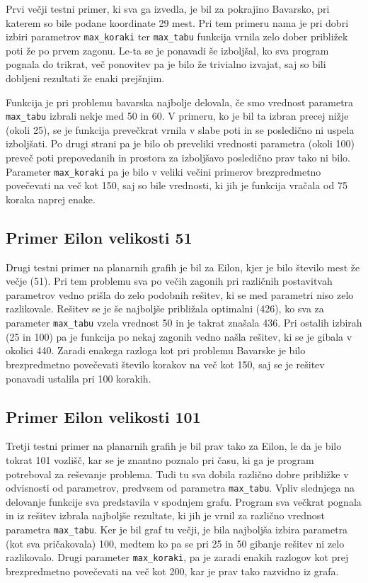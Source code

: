 \documentclass[10pt, a4paper]{article}
\begin{document}
Prvi večji testni primer, ki sva ga izvedla, je bil za pokrajino Bavarsko, pri katerem so bile podane koordinate 29 mest. Pri tem primeru nama je pri dobri izbiri parametrov \texttt{max\_koraki} ter \texttt{max\_tabu} funkcija vrnila zelo dober približek poti že po prvem zagonu. Le-ta se je ponavadi še izboljšal, ko sva program pognala do trikrat, več ponovitev pa je bilo že trivialno izvajat, saj so bili dobljeni rezultati že enaki prejšnjim. 

Funkcija je pri problemu bavarska najbolje delovala, če smo vrednost parametra \texttt{max\_tabu} izbrali nekje med 50 in 60. V primeru, ko je bil ta izbran precej nižje (okoli 25), se je funkcija prevečkrat vrnila v slabe poti in se posledično ni uspela izboljšati. Po drugi strani pa je bilo ob preveliki vrednosti parametra (okoli 100) preveč poti prepovedanih in prostora za izboljšavo posledično prav tako ni bilo. Parameter \texttt{max\_koraki} pa je bilo v veliki večini primerov brezpredmetno povečevati na več kot 150, saj so bile vrednosti, ki jih je funkcija vračala od 75 koraka naprej enake.



\subsection{Primer Eilon velikosti 51}

Drugi testni primer na planarnih grafih je bil za Eilon, kjer je bilo število mest že večje (51). Pri tem problemu sva po večih zagonih pri različnih postavitvah parametrov vedno prišla do zelo podobnih rešitev, ki se med parametri niso zelo razlikovale. Rešitev se je še najboljše približala optimalni (426), ko sva za parameter \texttt{max\_tabu} vzela vrednost 50 in je takrat znašala 436. Pri ostalih izbirah (25 in 100) pa je funkcija po nekaj zagonih vedno našla rešitev, ki se je gibala v okolici 440. Zaradi enakega razloga kot pri problemu Bavarske je bilo brezpredmetno povečevati število korakov na več kot 150, saj se je rešitev ponavadi ustalila pri 100 korakih.



\subsection{Primer Eilon velikosti 101}

Tretji testni primer na planarnih grafih je bil prav tako za Eilon, le da je bilo tokrat 101 vozlišč, kar se je znantno poznalo pri času, ki ga je program potreboval za reševanje problema. Tudi tu sva dobila različno dobre približke v odvisnosti od parametrov,  predvsem od parametra \texttt{max\_tabu}. Vpliv slednjega na delovanje funkcije sva predstavila v spodnjem grafu. Program sva večkrat pognala in iz rešitev izbrala najboljše rezultate, ki jih je vrnil za različno vrednost parametra \texttt{max\_tabu}. Ker je bil graf tu večji, je bila najboljša izbira parametra (kot sva pričakovala) 100, medtem ko pa se pri 25 in 50 gibanje rešitev ni zelo razlikovalo. Drugi parameter \texttt{max\_koraki}, pa je zaradi enakih razlogov kot prej brezpredmetno povečevati na več kot 200, kar je prav tako razvidno iz grafa.
\end{document}

